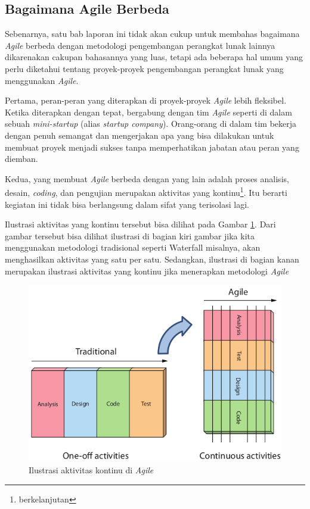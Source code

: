 \documentclass[a4paper, 12pt, oneside]{report}
\begin{document}
\subsection{Bagaimana Agile Berbeda}
\onehalfspacing Sebenarnya, satu bab laporan ini tidak akan cukup untuk membahas bagaimana \textit{Agile} berbeda dengan metodologi pengembangan perangkat lunak lainnya dikarenakan cakupan bahasannya yang luas, tetapi ada beberapa hal umum yang perlu diketahui tentang proyek-proyek pengembangan perangkat lunak yang menggunakan \textit{Agile}.

\onehalfspacing Pertama, peran-peran yang diterapkan di proyek-proyek \textit{Agile} lebih fleksibel. Ketika diterapkan dengan tepat, bergabung dengan tim \textit{Agile} seperti di dalam sebuah \textit{mini-startup} (alias \textit{startup company}). Orang-orang di dalam tim bekerja dengan penuh semangat dan mengerjakan apa yang bisa dilakukan untuk membuat proyek menjadi sukses tanpa memperhatikan jabatan atau peran yang diemban.

\onehalfspacing Kedua, yang membuat \textit{Agile} berbeda dengan yang lain adalah proses analisis, desain, \textit{coding}, dan pengujian merupakan aktivitas yang kontinu\footnote{berkelanjutan}. Itu berarti kegiatan ini tidak bisa berlangsung dalam sifat yang terisolasi lagi.

\newpage

Ilustrasi aktivitas yang kontinu tersebut bisa dilihat pada Gambar \ref{agile-process}. Dari gambar tersebut bisa dilihat ilustrasi di bagian kiri gambar jika kita menggunakan metodologi tradisional seperti Waterfall misalnya, akan menghasilkan aktivitas yang satu per satu. Sedangkan, ilustrasi di bagian kanan merupakan ilustrasi aktivitas yang kontinu jika menerapkan metodologi \textit{Agile}

\begin{figure}[htp]
\centering
\includegraphics[scale=0.60]{images/agile-process.png}
\caption{Ilustrasi aktivitas kontinu di \textit{Agile} \cite{agile-samurai}}
\label{agile-process}
\end{figure}
\end{document}
